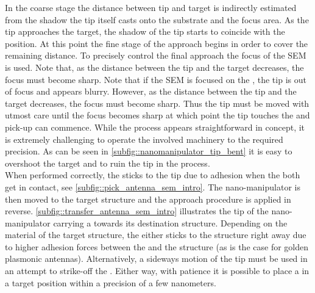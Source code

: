 	In the coarse stage the distance between tip and target \nd is indirectly estimated from the shadow the tip itself casts onto the substrate and the focus area. As the tip approaches the target, the shadow of the tip starts to coincide with the \nd position. At this point the fine stage of the approach begins in order to cover the remaining distance. To precisely control the final approach the focus of the SEM is used. Note that, as the distance between the tip and the target decreases, the focus must become sharp. Note that if the SEM is focused on the \nd, the tip is out of focus and appears blurry. However, as the distance between the tip and the target decreases, the focus must become sharp. Thus the tip must be moved with utmost care until the focus becomes sharp at which point the tip touches the \nd and pick-up can commence. While the process appears straightforward in concept, it is extremely challenging to operate the involved machinery to the required precision. As can be seen in \cref{subfig::nanomanipulator_tip_bent} it is easy to overshoot the target and to ruin the tip in the process.
	\\
	When performed correctly, the \nd sticks to the tip due to adhesion when the both get in contact, see \cref{subfig::pick_antenna_sem_intro}.
	The nano-manipulator is then moved to the target structure and the approach procedure is applied in reverse. \cref{subfig::transfer_antenna_sem_intro} illustrates the tip of the nano-manipulator carrying a \nd towards its destination structure.
	Depending on the material of the target structure, the \nd either sticks to the structure right away due to higher adhesion forces between the \nd and the structure (as is the case for golden plasmonic antennas).
	Alternatively, a sideways motion of the \np tip must be used in an attempt to strike-off the \nd.
	Either way, with patience it is possible to place a \nd in a target position within a precision of a few nanometers.
	\\

